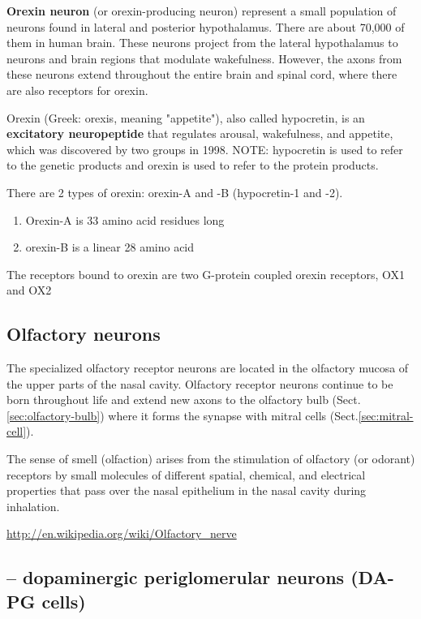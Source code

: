 {\bf Orexin neuron} (or orexin-producing neuron) represent a small population of
neurons found in lateral and posterior hypothalamus. There are about 70,000 of
them in human brain. These neurons project from the lateral hypothalamus to
neurons and brain regions that modulate wakefulness.
However, the axons from these neurons extend throughout the entire brain and
spinal cord, where there are also receptors for orexin. 

Orexin (Greek: orexis, meaning "appetite"), also called hypocretin, is an {\bf
excitatory neuropeptide} that regulates arousal, wakefulness, and appetite,
which was discovered by two groups in 1998.
NOTE: hypocretin is used to refer to the genetic products and orexin is used to
refer to the protein products.

There are 2 types of orexin:  orexin-A and -B (hypocretin-1 and -2). 
\begin{enumerate}
  \item  Orexin-A is 33 amino acid residues long
  
  \item  orexin-B is a linear 28 amino acid
\end{enumerate}
The receptors bound to orexin are two G-protein coupled orexin receptors, OX1
and OX2




\subsection{Olfactory neurons}
\label{sec:olfactory-nerve}

The specialized olfactory receptor neurons are located in the olfactory mucosa
of the upper parts of the nasal cavity.
Olfactory receptor neurons continue to be born throughout life and extend new
axons to the olfactory bulb (Sect.\ref{sec:olfactory-bulb}) where it forms the
synapse with mitral cells (Sect.\ref{sec:mitral-cell}).

The sense of smell (olfaction) arises from the stimulation of olfactory (or
odorant) receptors by small molecules of different spatial, chemical, and
electrical properties that pass over the nasal epithelium in the nasal cavity
during inhalation.

\url{http://en.wikipedia.org/wiki/Olfactory_nerve}

\subsection{-- dopaminergic periglomerular neurons (DA-PG cells)}
\label{sec:olfactory-nerve-dopaminergic-periglomerular-neuron}
\label{sec:periglomerular-cell}
\label{sec:DA-PG-cells}

